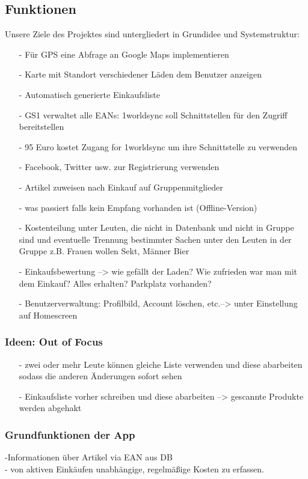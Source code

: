\documentclass[12pt,a4paper]{article}
\begin{document}
\subsection{Funktionen}
Unsere Ziele des Projektes sind untergliedert in Grundidee und Systemstruktur:
\begin{itemize}
\item[-] Für GPS eine Abfrage an Google Maps implementieren
\item[-] Karte mit Standort verschiedener Läden dem Benutzer anzeigen
\item[-] Automatisch generierte Einkaufsliste
\item[-] GS1 verwaltet alle EANs: 1worldsync soll Schnittstellen für den Zugriff bereitstellen
\item[-] 95 Euro kostet Zugang for 1worldsync um ihre Schnittstelle zu verwenden
\item[-] Facebook, Twitter usw. zur Registrierung verwenden
\item[-] Artikel zuweisen nach Einkauf auf Gruppenmitglieder 
\item[-] was passiert falls kein Empfang vorhanden ist (Offline-Version)
\item[-] Kostenteilung unter Leuten, die nicht in Datenbank und nicht in Gruppe sind und eventuelle Trennung bestimmter Sachen unter den Leuten in der Gruppe z.B. Frauen wollen Sekt, Männer Bier
\item[-] Einkaufsbewertung --> wie gefällt der Laden? Wie zufrieden war man mit dem Einkauf? Alles erhalten? Parkplatz 
vorhanden?
\item[-] Benutzerverwaltung: Profilbild, Account löschen, etc.--> unter Einstellung auf Homescreen
\end{itemize}
\subsubsection*{Ideen: Out of Focus}
\begin{itemize}
\item[-] zwei oder mehr Leute können gleiche Liste verwenden und diese abarbeiten sodass die anderen Änderungen sofort sehen
\item[-] Einkaufsliste vorher schreiben und diese abarbeiten --> gescannte Produkte werden abgehakt
\end{itemize}
\subsubsection{Grundfunktionen der App}
-Informationen über Artikel via EAN aus DB \\
- von aktiven Einkäufen unabhängige, regelmäßige Kosten zu erfassen. \\
\end{document}
